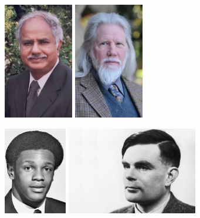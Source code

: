 \documentclass[xcolor={usenames,dvipsnames,svgnames,table},12pt]{beamer}
\begin{document}
\begin{frame}{}
  \begin{center}
    \includegraphics[height=2in]{dabbala-reddy.jpg} \quad
    \includegraphics[height=2in]{whitfield-diffie.jpg}
  \end{center}
\end{frame}

\begin{frame}{}
  \begin{center}
    \includegraphics[height=1.5in]{ellis_skip_young.jpeg} \quad
    \includegraphics[height=1.5in]{Alan-Turing.jpeg}
  \end{center}
\end{frame}
\end{document}
